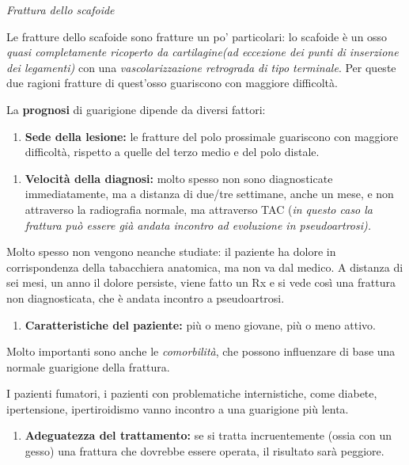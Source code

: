 \documentclass[]{article}
\date{}
\begin{document}
\emph{Frattura dello scafoide}

Le fratture dello scafoide sono fratture un po' particolari: lo scafoide
è un osso \emph{quasi completamente ricoperto da cartilagine(ad
eccezione dei punti di inserzione dei legamenti)} con una
\emph{vascolarizzazione retrograda di tipo terminale}. Per queste due
ragioni fratture di quest'osso guariscono con maggiore difficoltà.

La \textbf{prognosi} di guarigione dipende da diversi fattori:

\begin{enumerate}
\def\labelenumi{\arabic{enumi}.}
\item
  \textbf{Sede della lesione:} le fratture del polo prossimale
  guariscono con maggiore difficoltà, rispetto a quelle del terzo medio
  e del polo distale.
\end{enumerate}

\begin{enumerate}
\def\labelenumi{\arabic{enumi}.}
\item
  \textbf{Velocità della diagnosi:} molto spesso non sono diagnosticate
  immediatamente, ma a distanza di due/tre settimane, anche un mese, e
  non attraverso la radiografia normale, ma attraverso TAC (\emph{in
  questo caso la frattura può essere già andata incontro ad evoluzione
  in pseudoartrosi).}
\end{enumerate}

Molto spesso non vengono neanche studiate: il paziente ha dolore in
corrispondenza della tabacchiera anatomica, ma non va dal medico. A
distanza di sei mesi, un anno il dolore persiste, viene fatto un Rx e si
vede così una frattura non diagnosticata, che è andata incontro a
pseudoartrosi.

\begin{enumerate}
\def\labelenumi{\arabic{enumi}.}
\item
  \textbf{Caratteristiche del paziente:} più o meno giovane, più o meno
  attivo.
\end{enumerate}

Molto importanti sono anche le \emph{comorbilità}, che possono
influenzare di base una normale guarigione della frattura.

I pazienti fumatori, i pazienti con problematiche internistiche, come
diabete, ipertensione, ipertiroidismo vanno incontro a una guarigione
più lenta.

\begin{enumerate}
\def\labelenumi{\arabic{enumi}.}
\item
  \textbf{Adeguatezza del trattamento:} se si tratta incruentemente
  (ossia con un gesso) una frattura che dovrebbe essere operata, il
  risultato sarà peggiore.
\end{enumerate}
\end{document}

